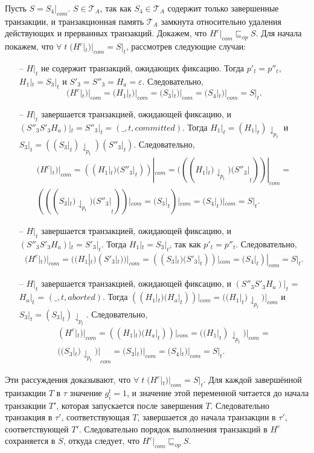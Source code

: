 \begin{myproof}
Пусть $S = S_4|_{com}$. $S \in \mathcal{T}_A$, так как $S_4 \in \mathcal{T}_A$ содержит только завершенные транзакции, и транзакционная память $\mathcal{T}_A$ замкнута относительно удаления действующих и прерванных транзакций. Докажем, что $H^c|_{com} \sqsubseteq_{op} S$. Для начала покажем, что $\forall \; t \; (H^c|_t)|_{com} = S|_t$, рассмотрев следующие случаи:
\begin{itemize}
\item[--] $H|_t$ не содержит транзакций, ожидающих фиксацию. Тогда $p'_t = p''_t$, $H_1|_t = S_3|_t$ и $S'_3 = S''_3 = H_a = \varepsilon$. Следовательно, $$(H^c|_t)|_{com} = (H_1|_t)|_{com} = (S_3|_t)|_{com} = (S_4|_t)|_{com} = S|_t.$$
\item[--] $H|_t$ завершается транзакцией, ожидающей фиксацию, и $(S''_3S'_3H_a)|_t = S''_3|_t = (\_,t,committed)$. Тогда $H_1|_t = (H_1|_t)\downharpoonleft_{p_t}$ и $S_3|_t = ((S_3|_t)\downharpoonleft_{p_t})(S''_3|_t)$. Следовательно, 
\begin{align*}
(H^c|_t)|_{com} = ((H_1|_t)(S''_3|_t))|_{com} = (((H_1|_t)\downharpoonleft_{p_t})(S''_3|_t))|_{com} = \\
(((S_3|_t)\downharpoonleft_{p_t})(S''_3|_t))|_{com} = (S_3|_t)|_{com} = (S_4|_t)|_{com} = S|_t.
\end{align*}
\item[--] $H|_t$ завершается транзакцией, ожидающей фиксацию, и $(S''_3S'_3H_a)|_t = S'_3|_t$. Тогда $H_1|_t = S_3|_t$, так как $p'_t = p''_t$. Следовательно, 
\begin{align*}
(H^c|_t)|_{com} = ((H_1|_t)(S'_3|_t))|_{com} = ((S_3|_t)(S'_3|_t))|_{com} = (S_4|_t)|_{com} = S|_t.
\end{align*}
\item[--] $H|_t$ завершается транзакцией, ожидающей фиксацию, и $(S''_3S'_3H_a)|_t$ = $H_a|_t$ = $(\_, t, aborted)$. Тогда $((H_1|_t)(H_a|_t))|_{com} = ((H_1|_t)\downharpoonleft_{p_t})|_{com}$ и $S_3|_t = (S_3|_t)\downharpoonleft_{p_t}$. Следовательно,
\begin{align*}
(H^c|_t)|_{com} = ((H_1|_t)(H_a|_t))|_{com} = ((H_1|_t)\downharpoonleft_{p_t})|_{com} =\\
((S_3|_t)\downharpoonleft_{p_t})|_{com} = (S_3|_t)|_{com} = (S_4|_t)|_{com} = S|_t. 
\end{align*}
\end{itemize}

Эти рассуждения доказывают, что $\forall \; t \; (H^c|_t)|_{com} = S|_t$. Для каждой завершённой транзакции $T$ в $\tau$ значение $g^t_i = 1$, и значение этой переменной читается до начала транзакции $T'$, которая запускается после завершения $T$. Следовательно транзакция в $\tau'$, соответствующая $T$, завершается до начала транзакции в $\tau'$, соответствующей $T'$. Следовательно порядок выполнения транзакций в $H^c$ сохраняется в $S$, откуда следует, что $H^c|_{com} \sqsubseteq_{op} S$. 
\end{myproof}

